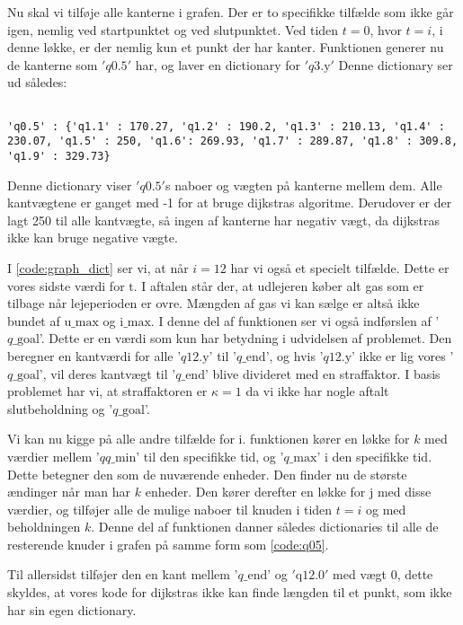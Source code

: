 Nu skal vi tilføje alle kanterne i grafen. Der er to specifikke tilfælde som ikke går igen, nemlig ved startpunktet og ved slutpunktet. Ved tiden $t=0$, hvor $t=i$, i denne løkke, er der nemlig kun et punkt der har kanter. Funktionen generer nu de kanterne som $'q\textrm{0.5}'$ har, og laver en dictionary for $'q\textrm{3.y}'$ 
Denne dictionary ser ud således:

\begin{lstlisting}[label=code:q05, caption=Dictionary for $q \textrm{0.5}$]

'q0.5' : {'q1.1' : 170.27, 'q1.2' : 190.2, 'q1.3' : 210.13, 'q1.4' : 230.07, 'q1.5' : 250, 'q1.6': 269.93, 'q1.7' : 289.87, 'q1.8' : 309.8, 'q1.9' : 329.73}
\end{lstlisting}
Denne dictionary viser $'q\textrm{0.5}'$s naboer og vægten på kanterne mellem dem. Alle kantvægtene er ganget med -1 for at bruge dijkstras algoritme. Derudover er der lagt 250 til alle kantvægte, så ingen af kanterne har negativ vægt, da dijkstras ikke kan bruge negative vægte.

I \autoref{code:graph_dict} ser vi, at når $i=12$ har vi også et specielt tilfælde. Dette er vores sidste værdi for $\textrm{t}$. I aftalen står der, at udlejeren køber alt gas som er tilbage når lejeperioden er ovre.   Mængden af gas vi kan sælge er altså ikke bundet af $\textrm{u\_max}$ og $\textrm{i\_max}$. I denne del af funktionen ser vi også indførslen af '$q\textrm{\_goal}$'. Dette er en værdi som kun har betydning i udvidelsen af problemet. Den beregner  en kantværdi for alle '$q\textrm{12.y}$' til '$q\textrm{\_end}$', og hvis '$q\textrm{12.y}$' ikke er lig vores '$q\textrm{\_goal}$', vil deres kantvægt til '$q\textrm{\_end}$' blive divideret med en straffaktor. I basis problemet har vi, at straffaktoren er $\kappa=1$ da vi ikke har nogle aftalt slutbeholdning og '$q\textrm{\_goal}$'.

Vi kan nu kigge på alle andre tilfælde for i. funktionen kører en løkke for $k$ med værdier mellem '$qq\textrm{\_min}$' til den specifikke tid, og '$q\textrm{\_max}$' i den specifikke tid. Dette betegner den som de nuværende enheder.
Den finder nu de største ændinger når man har $k$ enheder. Den kører derefter en løkke for $\textrm{j}$ med disse værdier, og tilføjer alle de mulige naboer til knuden i tiden $t=i$ og med beholdningen $k$. Denne del af funktionen danner således dictionaries til alle de resterende knuder i grafen på samme form som \autoref{code:q05}.

Til allersidst tilføjer den en kant mellem '$q\textrm{\_end}$' og $'\textrm{q12.0}'$ med vægt $0$, dette skyldes, at vores kode for dijkstras ikke kan finde længden til et punkt, som ikke har sin egen dictionary.

